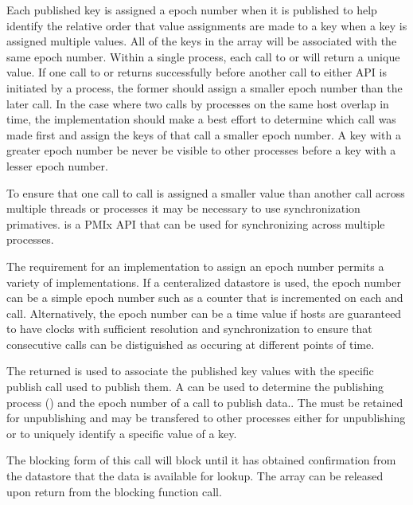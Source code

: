 Each published key is assigned a epoch number when it is published to help identify the relative order
that value assignments are made to a key when a key is assigned multiple values.
All of the keys in the  array will be associated with the same epoch number.  
Within a single process, each call to  or 
will return a unique value.   
If one call to  or  returns successfully before 
another call to either \ac{API} is initiated by a process,
the former should assign a smaller epoch number than the 
later call.  In the case where two calls by processes on the same host overlap in time, 
the implementation should make a best effort to determine which call was made first and assign the 
keys of that call a smaller epoch number.  
A key with a greater epoch number be never be visible to other processes before a key with 
a lesser epoch number.

\adviceuserstart
To ensure that one call to  call is assigned a smaller value than another 
call across multiple threads or processes it may be necessary to use synchronization primatives. 
 is a \ac{PMIx} \ac{API} that can be used for synchronizing across multiple processes.
\adviceuserend

\adviceimplstart
The requirement for an implementation to assign an epoch number permits a variety of implementations.  If a centeralized 
datastore is used, the epoch number can be a simple epoch number such as a counter that is incremented on each
 and  call.  Alternatively, the epoch number can
be a time value if hosts are guaranteed to have clocks with sufficient resolution and synchronization to ensure
that consecutive calls can be distiguished as occuring at different points of time.
\adviceimplend

The returned  is used to associate the published key values with the specific publish
call used to publish them.  A  can be used to determine the publishing
process () and the epoch number of a call to publish data.. 
The  must be retained for unpublishing and may be transfered to other processes 
either for unpublishing or to uniquely identify a specific value of a key.

The blocking form of this call will block until it has obtained confirmation from the datastore that the data is available for lookup. 
The  array can be released upon return from the blocking function call.

